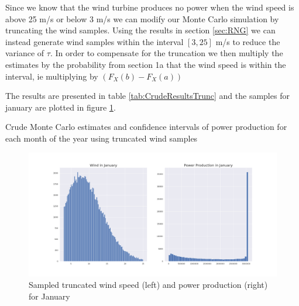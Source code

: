 \documentclass[a4paper]{article}
\begin{document}
Since we know that the wind turbine produces no power when the wind speed is above 25 m/s or below 3 m/s we can modify our Monte Carlo simulation by truncating the wind samples. Using the results in section \ref{sec:RNG} we can instead generate wind samples within the interval $[3,25]$ m/s to reduce the variance of $\tau$. In order to compensate for the truncation we then multiply the estimates by the probability from section 1a that the wind speed is within the interval, ie multiplying by $(F_X(b)-F_X(a))$

The results are presented in table \ref{tab:CrudeResultsTrunc} and the samples for january are plotted in figure \ref{fig:samplesJanTrunc}.
\begin{table}[H]
    \centering
    \caption{Crude Monte Carlo estimates and confidence intervals of power production for each month of the year using truncated wind samples}
    \label{tab:CrudeResultsTrunc}
    
\end{table}

\begin{figure}[H]
    \centering
    \includegraphics[width = 1.0\textwidth]{images/janCrudeMCTrunc}
    \caption{Sampled truncated wind speed (left) and power production (right) for January}
    \label{fig:samplesJanTrunc}
\end{figure}
\end{document}
